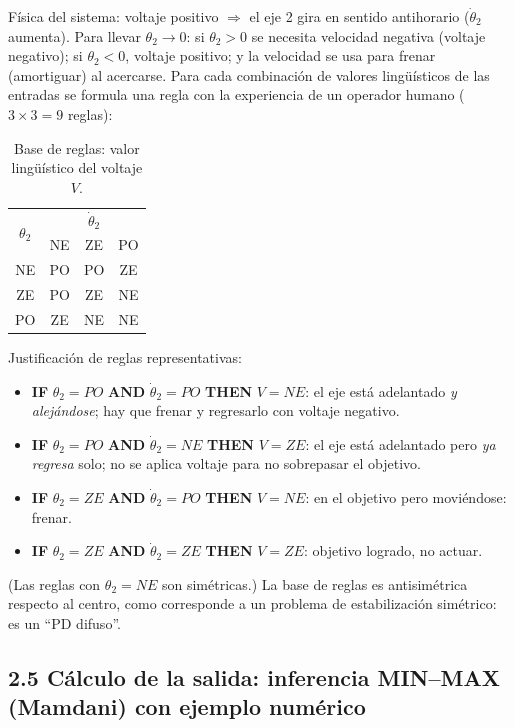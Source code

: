 \documentclass[11pt,a4paper]{article}
\begin{document}
Física del sistema: voltaje positivo $\Rightarrow$ el eje 2 gira en sentido antihorario ($\dot\theta_2$ aumenta). Para llevar $\theta_2\to 0$: si $\theta_2>0$ se necesita velocidad negativa (voltaje negativo); si $\theta_2<0$, voltaje positivo; y la velocidad se usa para frenar (amortiguar) al acercarse. Para cada combinación de valores lingüísticos de las entradas se formula una regla con la experiencia de un operador humano ($3\times 3=9$ reglas):

\begin{table}[h]
\centering
\begin{tabular}{c|ccc}
\toprule
\multirow{2}{*}{$\theta_2$} & \multicolumn{3}{c}{$\dot\theta_2$}\\
 & NE & ZE & PO\\
\midrule
NE & PO & PO & ZE\\
ZE & PO & ZE & NE\\
PO & ZE & NE & NE\\
\bottomrule
\end{tabular}
\caption{Base de reglas: valor lingüístico del voltaje $V$.}
\end{table}

Justificación de reglas representativas:
\begin{itemize}[itemsep=1pt]
\item \textbf{IF} $\theta_2=PO$ \textbf{AND} $\dot\theta_2=PO$ \textbf{THEN} $V=NE$: el eje está adelantado \emph{y alejándose}; hay que frenar y regresarlo con voltaje negativo.
\item \textbf{IF} $\theta_2=PO$ \textbf{AND} $\dot\theta_2=NE$ \textbf{THEN} $V=ZE$: el eje está adelantado pero \emph{ya regresa} solo; no se aplica voltaje para no sobrepasar el objetivo.
\item \textbf{IF} $\theta_2=ZE$ \textbf{AND} $\dot\theta_2=PO$ \textbf{THEN} $V=NE$: en el objetivo pero moviéndose: frenar.
\item \textbf{IF} $\theta_2=ZE$ \textbf{AND} $\dot\theta_2=ZE$ \textbf{THEN} $V=ZE$: objetivo logrado, no actuar.
\end{itemize}
(Las reglas con $\theta_2=NE$ son simétricas.) La base de reglas es antisimétrica respecto al centro, como corresponde a un problema de estabilización simétrico: es un ``PD difuso''.

\subsection*{2.5 Cálculo de la salida: inferencia MIN--MAX (Mamdani) con ejemplo numérico}
\end{document}
